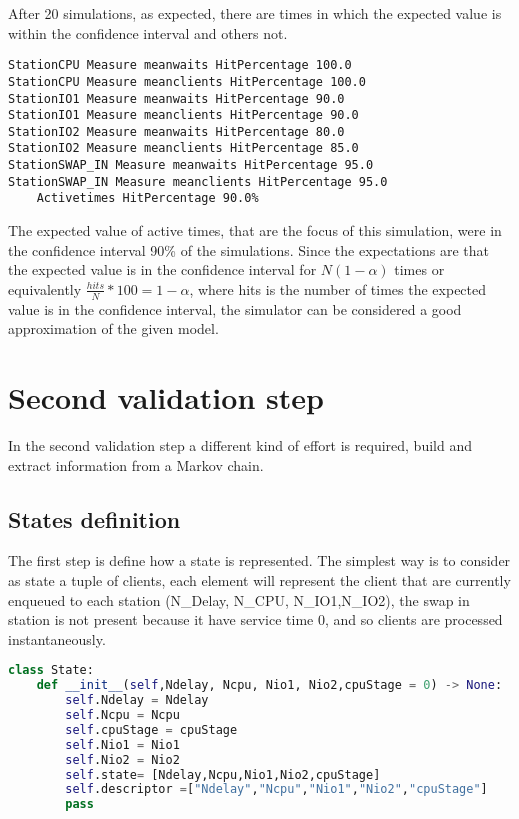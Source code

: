 \documentclass[12pt,a4paper]{article}
\begin{document}
After 20 simulations, as expected, there are times in which the expected value is within the confidence interval and others not. 
\begin{verbatim}
StationCPU Measure meanwaits HitPercentage 100.0
StationCPU Measure meanclients HitPercentage 100.0
StationIO1 Measure meanwaits HitPercentage 90.0
StationIO1 Measure meanclients HitPercentage 90.0
StationIO2 Measure meanwaits HitPercentage 80.0
StationIO2 Measure meanclients HitPercentage 85.0
StationSWAP_IN Measure meanwaits HitPercentage 95.0
StationSWAP_IN Measure meanclients HitPercentage 95.0
    Activetimes HitPercentage 90.0%
\end{verbatim}

The expected value of active times, that are the focus of this simulation, were in the confidence interval 90\% of the simulations. Since the expectations are that the expected value is in the confidence interval for $N(1-\alpha)$ times or equivalently $\frac{hits}{N}*100=1-\alpha$, where hits is the number of times the expected value is in the confidence interval, the simulator can be considered a good approximation of the given model.



\section{Second validation step}
In the second validation step a different kind of effort is required, build and extract information from a Markov chain.
\subsection{States definition}
The first step is define how a state is represented. The simplest way is to consider as state a tuple of clients, each element will represent the client that are currently enqueued to each station (N\_Delay, N\_CPU, N\_IO1,N\_IO2), the swap in station is not present because it have service time 0, and so clients are processed instantaneously. 
\begin{lstlisting}[language=python]
class State:
    def __init__(self,Ndelay, Ncpu, Nio1, Nio2,cpuStage = 0) -> None:
        self.Ndelay = Ndelay
        self.Ncpu = Ncpu
        self.cpuStage = cpuStage
        self.Nio1 = Nio1
        self.Nio2 = Nio2
        self.state= [Ndelay,Ncpu,Nio1,Nio2,cpuStage]
        self.descriptor =["Ndelay","Ncpu","Nio1","Nio2","cpuStage"]
        pass
\end{lstlisting}
\end{document}
